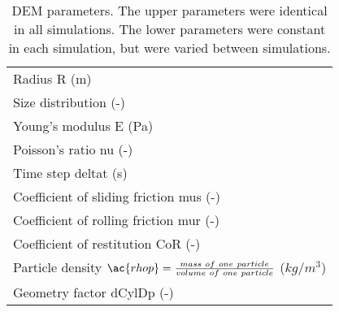 \begin{table}[h]
\centering
\begin{tabular}{l}
\hline 
    Radius \ac{R} (m)   \\ [5pt]

	Size distribution (-) \\ [5pt]

    Young's modulus \ac{E} (Pa)  \\ [5pt]

    Poisson's ratio \ac{nu} (-) \\ 
     Time step \ac{deltat} (s) \\ [5pt]
        \hline
     Coefficient of sliding friction \ac{mus} (-)\\  [5pt]
    Coefficient of rolling friction \ac{mur} (-) \\ [5pt]
    Coefficient of restitution \ac{CoR} (-)   \\ [5pt]
     Particle density $\ac{rhop} = \frac{mass ~ of ~ one ~ particle}{volume ~ of
     ~ one ~ particle}$ ($kg/m^3$)  \\ [5pt]
     Geometry factor \ac{dCylDp} (-)  \\ [5pt]
   
\hline
\end{tabular}
\caption[DEM parameters]{DEM parameters. The upper parameters were
identical in all simulations. The lower parameters were constant in each
simulation, but were varied between simulations.}
\label{tab:08DEMparameters}
\end{table}

